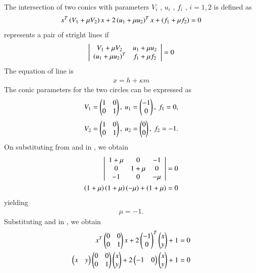 \documentclass[journal]{IEEEtran}
\begin{document}
The intersection of two conics with parameters $V_i$ , $u_i$ , $f_i$ , $i = 1, 2$ is defined as
\begin{align}
      x^T\left(V_1+\mu V_2\right)x+2\left(u_1+\mu u_2\right)^Tx+\left(f_1+\mu f_2\right)=0
\end{align}
 represents a pair of stright lines if 
\begin{align}
\left| \begin{array}{cc}
V_1+\mu V_2 & u_1+\mu u_2 \\
\left(u_1+\mu u_2\right)^T & f_1+\mu f_2
\end{array} \right| =0
\end{align}
The equation of line is
\begin{align}
x=h+\kappa m
\end{align}
The conic parameters for the two circles can be expressed as
 \begin{align}
V_1 = \begin{pmatrix}1 & 0 \\ 0 & 1\end{pmatrix}, \ u_1 = \begin{pmatrix} -1 \\ 0\end{pmatrix}, \ f_1 = 0, 
 \end{align}
 \begin{align}
V_2 = \begin{pmatrix}1 & 0 \\ 0 & 1\end{pmatrix}, \ u_2 = \begin{pmatrix}0 \\ 0\end{pmatrix}, \ f_2 = -1.
 \end{align}
On substituting from  and  in , we obtain
\begin{align}
\left| \begin{array}{ccc}
1 + \mu & 0 & -1 \\ 0 & 1 + \mu & 0 \\ -1 & 0 & -\mu 
\end{array} \right| = 0 
\\
 \left(1+\mu\right) \left(1+\mu\right) \left(-\mu\right)+\left(1+\mu\right) =0
  \end{align}
yielding
 \begin{align}
\mu = -1.
 \end{align}
Substituting  and  in , we obtain
 \begin{align}
x^T \begin{pmatrix} 0 & 0 \\ 0 & 1\end{pmatrix} x + 2 \begin{pmatrix} -1 \\ 0\end{pmatrix}^T \begin{pmatrix} x \\ y\end{pmatrix} + 1 = 0 \\
 \begin{pmatrix}x & y\end{pmatrix} \begin{pmatrix}0 & 0 \\ 0 & 1\end{pmatrix} \begin{pmatrix}x \\ y\end{pmatrix}+2 \begin{pmatrix}-1 & 0\end{pmatrix} \begin{pmatrix}x \\ y\end{pmatrix}+1=0
 \end{align}
\end{document}
